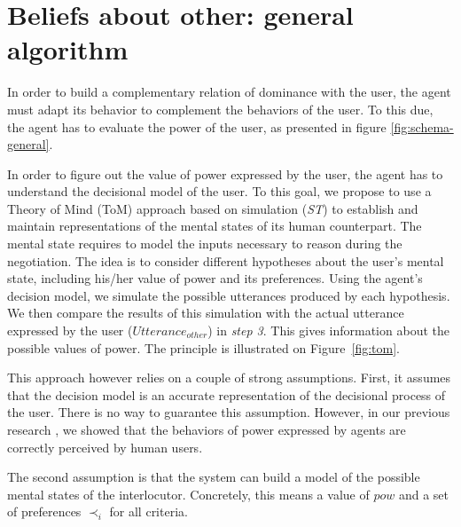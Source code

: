 \documentclass[conference, letterpaper]{IEEEtran}
\begin{document}
	\section{Beliefs about other: general algorithm}

	In order to build a complementary relation of dominance with the user, the agent must adapt its behavior to complement the behaviors of the user. To this due, the agent has to evaluate the power of the user, as presented in figure \ref{fig:schema-general}.
	
	In order to figure out the value of power expressed by the user, the agent has to understand the decisional model of the user. To this goal, we propose to use a Theory of Mind (ToM) approach \cite{premack1978does} based on simulation (\emph{ST}) to establish and maintain representations of the mental states of its human counterpart. 
	The mental state requires to model the inputs necessary to reason during the negotiation. The idea is to consider different hypotheses about the user's mental state, including his/her value of power and its preferences. Using the agent's decision model, we simulate the possible utterances produced by each hypothesis. 
	We then compare the results of this simulation with the actual utterance expressed by the user ($Utterance_{other}$) in \textit{step 3}. This gives information about the possible values of power. The principle is illustrated on Figure~\ref{fig:tom}.
	
	
	This approach however relies on a couple of strong assumptions. First, it assumes that the decision model is an accurate representation of the decisional process of the user. There is no way to guarantee this assumption. However, in our previous research \cite{ouali2017computational}, we showed that the behaviors of power expressed by agents are correctly perceived by human users. 
	
	The second assumption is that the system can build a model of the possible mental states of the interlocutor. Concretely, this means a value of $pow$ and a set of preferences $\prec_i$ for all criteria. 
	
\end{document}
